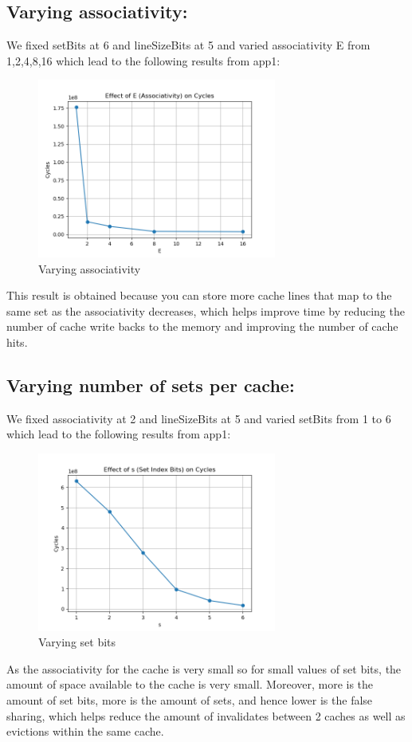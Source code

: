 \documentclass{article}
\begin{document}
\subsection{Varying associativity:}
We fixed setBits at 6 and lineSizeBits at 5 and varied associativity E from 1,2,4,8,16 which lead to the following results from app1:
\begin{figure}[h]
  \centering
  \includegraphics[width=0.7\textwidth]{plot_vary_E.png}
  \caption{Varying associativity}
  \label{fig:arch}
\end{figure}
This result is obtained because you can store more cache lines that map to the same set as the associativity decreases, which helps improve time by reducing the number of cache write backs to the memory and improving the number of cache hits.

\subsection{Varying number of sets per cache:}
We fixed associativity at 2 and lineSizeBits at 5 and varied setBits from 1 to 6 which lead to the following results from app1:
\begin{figure}[h]
  \centering
  \includegraphics[width=0.7\textwidth]{plot_vary_s.png}
  \caption{Varying set bits}
  \label{fig:arch}
\end{figure}
As the associativity for the cache is very small so for small values of set bits, the amount of space available to the cache is very small. Moreover, more is the amount of set bits, more is the amount of sets, and hence lower is the false sharing, which helps reduce the amount of invalidates between 2 caches as well as evictions within the same cache.
\end{document}
